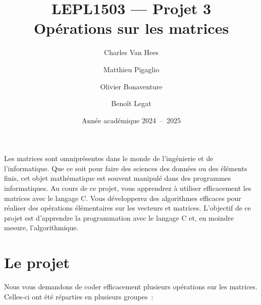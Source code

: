 \documentclass[a4paper, 12pt]{article}
\title{LEPL1503 --- Projet 3 \\ Opérations sur les matrices}
\author{Charles Van Hees \and Matthieu Pigaglio \and Olivier Bonaventure \and Benoît Legat}
\date{Année académique 2024~--~2025}
\begin{document}
\maketitle

Les matrices sont omniprésentes dans le monde de l'ingénierie et de l'informatique. Que ce soit pour faire des sciences des données ou des éléments finis, cet objet mathématique est souvent manipulé dans des programmes informatiques. Au cours de ce projet, vous apprendrez à utiliser efficacement les matrices avec le langage C. Vous développerez des algorithmes efficaces pour réaliser des opérations élémentaires sur les vecteurs et matrices. L'objectif de ce projet est d'apprendre la programmation avec le langage C et, en moindre mesure, l'algorithmique.

\section{Le projet}
\noindent Nous vous demandons de coder efficacement plusieurs opérations sur les matrices. Celles-ci ont été réparties en plusieurs groupes~:
\end{document}
